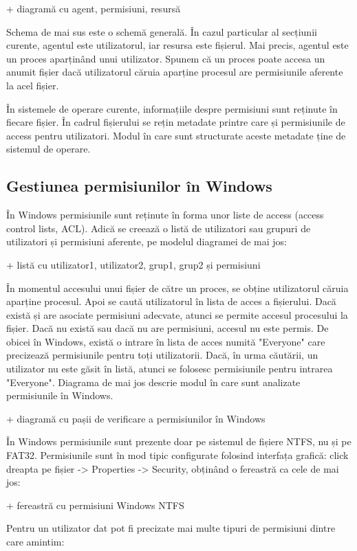 + diagramă cu agent, permisiuni, resursă

Schema de mai sus este o schemă generală. În cazul particular al secțiunii
curente, agentul este utilizatorul, iar resursa este fișierul. Mai precis,
agentul este un proces aparținând unui utilizator. Spunem că un proces poate
accesa un anumit fișier dacă utilizatorul căruia aparține procesul are
permisiunile aferente la acel fișier.

În sistemele de operare curente, informațiile despre permisiuni sunt reținute în
fiecare fișier. În cadrul fișierului se rețin metadate printre care și
permisiunile de access pentru utilizatori. Modul în care sunt structurate aceste
metadate ține de sistemul de operare.

\subsection{Gestiunea permisiunilor în Windows}
\label{sec:users-fs-perms-windows}


În Windows permisiunile sunt reținute în forma unor liste de access (access
control lists, ACL). Adică se creează o listă de utilizatori sau grupuri de
utilizatori și permisiuni aferente, pe modelul diagramei de mai jos:

+ listă cu utilizator1, utilizator2, grup1, grup2 și permisiuni

În momentul accesului unui fișier de către un proces, se obține utilizatorul
căruia aparține procesul. Apoi se caută utilizatorul în lista de acces a
fișierului. Dacă există și are asociate permisiuni adecvate, atunci se permite
accesul procesului la fișier. Dacă nu există sau dacă nu are permisiuni, accesul
nu este permis. De obicei în Windows, există o intrare în lista de acces numită
"Everyone" care precizează permisiunile pentru toți utilizatorii. Dacă, în urma
căutării, un utilizator nu este găsit în listă, atunci se folosesc permisiunile
pentru intrarea "Everyone". Diagrama de mai jos descrie modul în care sunt
analizate permisiunile în Windows.

+ diagramă cu pașii de verificare a permisiunilor în Windows

În Windows permisiunile sunt prezente doar pe sistemul de fișiere NTFS, nu și pe
FAT32. Permisiunile sunt în mod tipic configurate folosind interfața grafică:
click dreapta pe fișier -> Properties -> Security, obținând o fereastră ca cele
de mai jos:

+ fereastră cu permisiuni Windows NTFS

Pentru un utilizator dat pot fi precizate mai multe tipuri de permisiuni dintre
care amintim:

